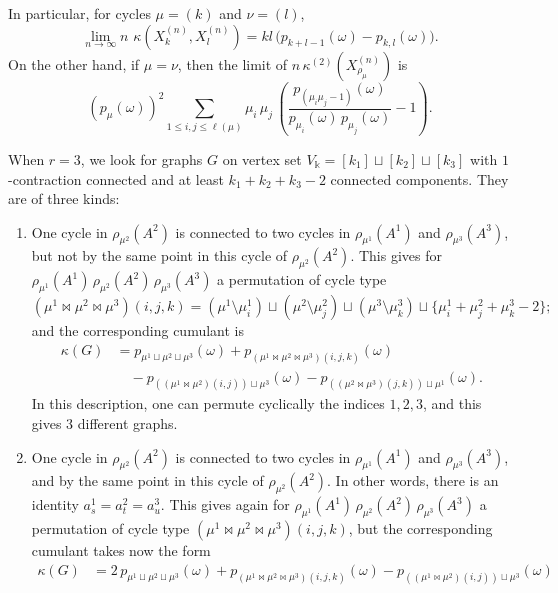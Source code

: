 \documentclass[12pt,a4paper,reqno]{amsart}
\theoremstyle{remark}
\newcommand{\SubGraph}{X^{(n)}}
\begin{document}
\noindent In particular, for cycles $\mu=(k)$ and $\nu=(l)$,
$$\lim_{n \to \infty} n\,\,\kappa\!\left(\SubGraph_{k},\SubGraph_{l}\right)=kl\,\big(p_{k+l-1}(\omega)-p_{k,l}(\omega)\big).$$
On the other hand, if $\mu=\nu$, then the limit of $n\,\kappa^{(2)}(X^{(n)}_{\rho_{\mu}})$ is
$$(p_{\mu}(\omega))^{2}\sum_{1 \leq i,j\leq \ell(\mu)} \mu_{i}\,\mu_{j}\,\left(\frac{p_{(\mu_{i} \mu_{j}-1)}(\omega)}{p_{\mu_{i}}(\omega)\,p_{\mu_{j}}(\omega)}-1\right).$$
\bigskip

When $r=3$, we look for graphs $G$ on vertex set $V_{\Bbbk}=[k_{1}]\sqcup [k_{2}]\sqcup [k_{3}]$ with $1$-contraction connected and at least $k_{1}+k_{2}+k_{3}-2$ connected components. They are of three kinds: \vspace{2mm}
\begin{enumerate}
\item One cycle in $\rho_{\mu^{2}}(A^{2})$ is connected to two cycles in $\rho_{\mu^{1}}(A^{1})$ and $\rho_{\mu^{3}}(A^{3})$, but not by the same point in this cycle of $\rho_{\mu^{2}}(A^{2})$. This gives for $\rho_{\mu^{1}}(A^{1})\,\rho_{\mu^{2}}(A^{2})\,\rho_{\mu^{3}}(A^{3})$ a permutation of cycle type
$$( \mu^{1} \Join \mu^{2} \Join \mu^{3}) (i,j,k)=(\mu^{1}\setminus \mu^{1}_{i})\sqcup (\mu^{2}\setminus \mu^{2}_{j})\sqcup (\mu^{3}\setminus \mu^{3}_{k})\sqcup\{\mu^{1}_{i}+\mu^{2}_{j}+\mu^{3}_{k}-2\};$$
and the corresponding cumulant is
\begin{align*}\kappa(G)&=p_{\mu^{1}\sqcup \mu^{2}\sqcup \mu^{3}}(\omega)+p_{(\mu^{1}\Join \mu^{2}\Join \mu^{3})(i,j,k)}(\omega) \\
&\,\,\,\,\,\,- p_{((\mu^{1}\Join \mu^{2})(i,j)) \sqcup \mu^{3}}(\omega)-p_{((\mu^{2}\Join \mu^{3})(j,k)) \sqcup \mu^{1}}(\omega).\end{align*}
In this description, one can permute cyclically the indices $1,2,3$, and this gives $3$ different graphs.\vspace{2mm}
\item One cycle in $\rho_{\mu^{2}}(A^{2})$ is connected to two cycles in $\rho_{\mu^{1}}(A^{1})$ and $\rho_{\mu^{3}}(A^{3})$, and by the same point in this cycle of $\rho_{\mu^{2}}(A^{2})$. In other words, there is an identity  $a^{1}_{s}=a^{2}_{t}=a^{3}_{u}$. This gives again for $\rho_{\mu^{1}}(A^{1})\,\rho_{\mu^{2}}(A^{2})\,\rho_{\mu^{3}}(A^{3})$ a permutation of cycle type $( \mu^{1} \Join \mu^{2} \Join \mu^{3}) (i,j,k)$, but the corresponding cumulant takes now the form
\begin{align*}\kappa(G)&=2\,p_{\mu^{1}\sqcup \mu^{2}\sqcup \mu^{3}}(\omega)+p_{(\mu^{1}\Join \mu^{2}\Join \mu^{3})(i,j,k)}(\omega) - p_{((\mu^{1}\Join \mu^{2})(i,j)) \sqcup \mu^{3}}(\omega)\\

\end{align*}
\end{enumerate}
\end{document}
